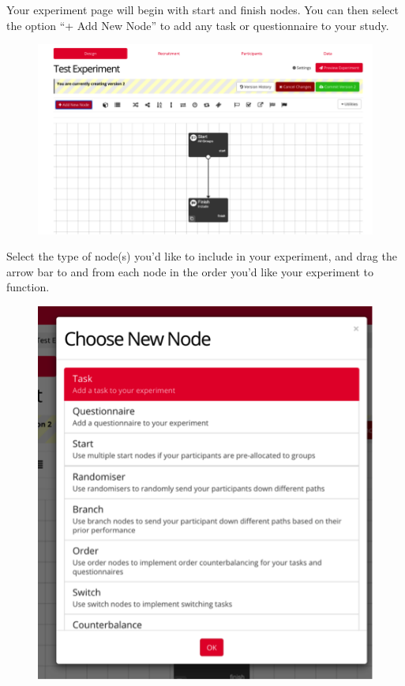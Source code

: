 \documentclass[]{book}
\begin{document}
Your experiment page will begin with start and finish nodes. You can then select the option ``+ Add New Node'' to add any task or questionnaire to your study.

\begin{figure}
\centering
\includegraphics{images/research_protocols/gorilla/gorilla26.png}
\caption{}
\end{figure}

Select the type of node(s) you'd like to include in your experiment, and drag the arrow bar to and from each node in the order you'd like your experiment to function.

\begin{figure}
\centering
\includegraphics{images/research_protocols/gorilla/gorilla27.png}
\caption{}
\end{figure}
\end{document}
